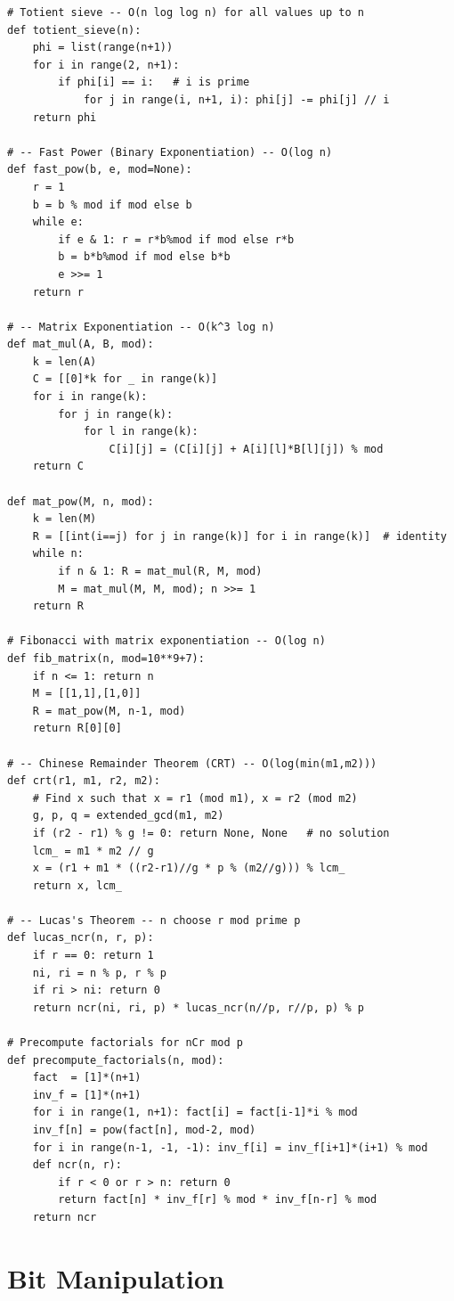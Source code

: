 \documentclass[11pt,a4paper]{report}
\begin{document}
\begin{lstlisting}
# Totient sieve -- O(n log log n) for all values up to n
def totient_sieve(n):
    phi = list(range(n+1))
    for i in range(2, n+1):
        if phi[i] == i:   # i is prime
            for j in range(i, n+1, i): phi[j] -= phi[j] // i
    return phi

# -- Fast Power (Binary Exponentiation) -- O(log n)
def fast_pow(b, e, mod=None):
    r = 1
    b = b % mod if mod else b
    while e:
        if e & 1: r = r*b%mod if mod else r*b
        b = b*b%mod if mod else b*b
        e >>= 1
    return r

# -- Matrix Exponentiation -- O(k^3 log n)
def mat_mul(A, B, mod):
    k = len(A)
    C = [[0]*k for _ in range(k)]
    for i in range(k):
        for j in range(k):
            for l in range(k):
                C[i][j] = (C[i][j] + A[i][l]*B[l][j]) % mod
    return C

def mat_pow(M, n, mod):
    k = len(M)
    R = [[int(i==j) for j in range(k)] for i in range(k)]  # identity
    while n:
        if n & 1: R = mat_mul(R, M, mod)
        M = mat_mul(M, M, mod); n >>= 1
    return R

# Fibonacci with matrix exponentiation -- O(log n)
def fib_matrix(n, mod=10**9+7):
    if n <= 1: return n
    M = [[1,1],[1,0]]
    R = mat_pow(M, n-1, mod)
    return R[0][0]

# -- Chinese Remainder Theorem (CRT) -- O(log(min(m1,m2)))
def crt(r1, m1, r2, m2):
    # Find x such that x = r1 (mod m1), x = r2 (mod m2)
    g, p, q = extended_gcd(m1, m2)
    if (r2 - r1) % g != 0: return None, None   # no solution
    lcm_ = m1 * m2 // g
    x = (r1 + m1 * ((r2-r1)//g * p % (m2//g))) % lcm_
    return x, lcm_

# -- Lucas's Theorem -- n choose r mod prime p
def lucas_ncr(n, r, p):
    if r == 0: return 1
    ni, ri = n % p, r % p
    if ri > ni: return 0
    return ncr(ni, ri, p) * lucas_ncr(n//p, r//p, p) % p

# Precompute factorials for nCr mod p
def precompute_factorials(n, mod):
    fact  = [1]*(n+1)
    inv_f = [1]*(n+1)
    for i in range(1, n+1): fact[i] = fact[i-1]*i % mod
    inv_f[n] = pow(fact[n], mod-2, mod)
    for i in range(n-1, -1, -1): inv_f[i] = inv_f[i+1]*(i+1) % mod
    def ncr(n, r):
        if r < 0 or r > n: return 0
        return fact[n] * inv_f[r] % mod * inv_f[n-r] % mod
    return ncr
\end{lstlisting}

\section{Bit Manipulation}
\end{document}
